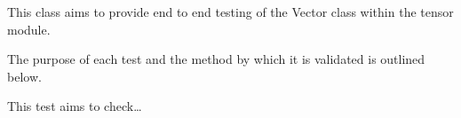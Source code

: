 \documentclass[letterpaper,10pt,english]{sphinxmanual}
\begin{document}

\begin{fulllineitems}
\label{\detokenize{index:tests.test_tensor.TestVector}}
\pysigstartsignatures
{}
\pysigstopsignatures
\sphinxAtStartPar
This class aims to provide end to end testing of the
Vector class within the tensor module.

\sphinxAtStartPar
The purpose of each test and the method by which it
is validated is outlined below.

\begin{fulllineitems}
\label{\detokenize{index:tests.test_tensor.TestVector.test_vector_construction}}
\pysigstartsignatures
{}
\pysigstopsignatures
\sphinxAtStartPar
This test aims to check…

\end{fulllineitems}


\end{fulllineitems}
\end{document}
